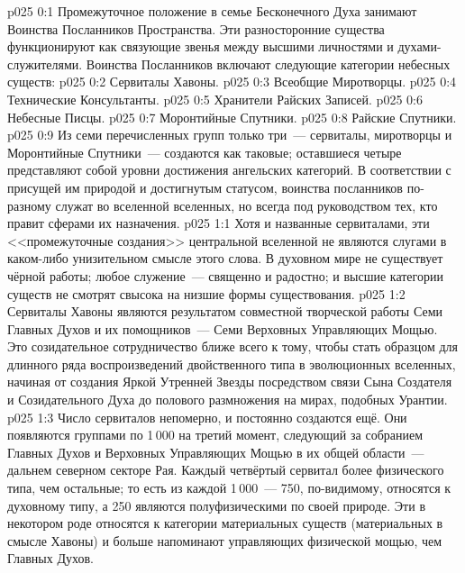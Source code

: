 \author{Высокоуполномоченный}
\vs p025 0:1 Промежуточное положение в семье Бесконечного Духа занимают Воинства Посланников Пространства. Эти разносторонние существа функционируют как связующие звенья между высшими личностями и духами\hyp{}служителями. Воинства Посланников включают следующие категории небесных существ:
\vs p025 0:2 Сервиталы Хавоны.
\vs p025 0:3 Всеобщие Миротворцы.
\vs p025 0:4 Технические Консультанты.
\vs p025 0:5 Хранители Райских Записей.
\vs p025 0:6 Небесные Писцы.
\vs p025 0:7 Моронтийные Спутники.
\vs p025 0:8 Райские Спутники.
\vs p025 0:9 \pc Из семи перечисленных групп только три~--- сервиталы, миротворцы и Моронтийные Спутники~--- создаются как таковые; оставшиеся четыре представляют собой уровни достижения ангельских категорий. В соответствии с присущей им природой и достигнутым статусом, воинства посланников по\hyp{}разному служат во вселенной вселенных, но всегда под руководством тех, кто правит сферами их назначения.
\vs p025 1:1 Хотя и названные сервиталами, эти <<промежуточные создания>> центральной вселенной не являются слугами в каком\hyp{}либо унизительном смысле этого слова. В духовном мире не существует чёрной работы; любое служение~--- священно и радостно; и высшие категории существ не смотрят свысока на низшие формы существования.
\vs p025 1:2 \pc Сервиталы Хавоны являются результатом совместной творческой работы Семи Главных Духов и их помощников~--- Семи Верховных Управляющих Мощью. Это созидательное сотрудничество ближе всего к тому, чтобы стать образцом для длинного ряда воспроизведений двойственного типа в эволюционных вселенных, начиная от создания Яркой Утренней Звезды посредством связи Сына Создателя и Созидательного Духа до полового размножения на мирах, подобных Урантии.
\vs p025 1:3 Число сервиталов непомерно, и постоянно создаются ещё. Они появляются группами по 1\,000 на третий момент, следующий за собранием Главных Духов и Верховных Управляющих Мощью в их общей области~--- дальнем северном секторе Рая. Каждый четвёртый сервитал более физического типа, чем остальные; то есть из каждой 1\,000~--- 750, по\hyp{}видимому, относятся к духовному типу, а 250 являются полуфизическими по своей природе. Эти  в некотором роде относятся к категории материальных существ (материальных в смысле Хавоны) и больше напоминают управляющих физической мощью, чем Главных Духов.
